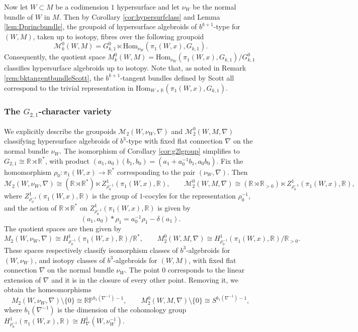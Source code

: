 \documentclass[10pt]{amsart}
\numberwithin{theoremalpha}{section}
\numberwithin{equation}{section}
\numberwithin{definition}{section}
\numberwithin{theorem}{section}
\numberwithin{proposition}{section}
\numberwithin{lemma}{section}
\numberwithin{example}{section}
\numberwithin{remark}{section}
\numberwithin{corollary}{section}
\numberwithin{question}{section}
\numberwithin{problem}{section}
\numberwithin{assumption}{section}
\theoremstyle{named}
\numberwithin{equation}{section}
\begin{document}
Now let $W \subset M$ be a codimension $1$ hypersurface and let $\nu_{W}$ be the normal bundle of $W$ in $M$. Then by Corollary \ref{cor:hypersurfclass} and Lemma \ref{lem:Dprincbundle}, the groupoid of hypersurface algebroids of $b^{k+1}$-type for $(W,M)$, taken up to isotopy, fibres over the following groupoid 
\[
\mathcal{M}^0_{k}(W,M) = G_{k,1}^{0} \ltimes \mathrm{Hom}_{\nu_W}(\pi_{1}(W,x), G_{k,1}). 
\]
Consequently, the quotient space $M^0_{k}(W,M) = \mathrm{Hom}_{\nu_W}(\pi_{1}(W,x), G_{k,1})/G_{k,1}^0$ classifies hypersurface algebroids up to isotopy. Note that, as noted in Remark \ref{rem:bktangentbundleScott}, the $b^{k+1}$-tangent bundles defined by Scott \cite{MR3523250} all correspond to the trivial representation in $\mathrm{Hom}_{W \times \mathbb{R}}(\pi_{1}(W,x), G_{k,1})$. 
\setcounter{subsection}{1}
\subsubsection{The $G_{2,1}$-character variety}
We explicitly describe the groupoids $\mathcal{M}_{2}(W, \nu_W, \nabla)$ and $\mathcal{M}^0_{2}(W,M, \nabla)$ classifying hypersurface algebroids of $b^3$-type with fixed flat connection $\nabla$ on the normal bundle $\nu_W$. The isomorphism of Corollary \ref{cor:g2lgroup} simplifies to $G_{2,1} \cong \mathbb{R} \rtimes \mathbb{R}^*$, with product $(a_1, a_0)(b_1, b_0) = (a_1 + a_0^{-1} b_1, a_0 b_0)$. Fix the homomorphism $\rho_0 : \pi_1(W,x) \to \mathbb{R}^*$ corresponding to the pair $(\nu_W, \nabla)$. Then 
\[
\mathcal{M}_{2}(W, \nu_W, \nabla) \cong (\mathbb{R} \rtimes \mathbb{R}^*) \ltimes Z^{1}_{\rho_0^{-1}}(\pi_{1}(W,x), \mathbb{R}), \qquad \mathcal{M}^0_{2}(W, M, \nabla) \cong (\mathbb{R} \rtimes \mathbb{R}_{>0}) \ltimes Z^{1}_{\rho_0^{-1}}(\pi_{1}(W,x), \mathbb{R}),
\]
where $Z^{1}_{\rho_0^{-1}}(\pi_{1}(W,x), \mathbb{R})$ is the group of $1$-cocyles for the representation $\rho_0^{-1}$, and the action of $\mathbb{R} \rtimes \mathbb{R}^*$ on $Z^{1}_{\rho_0^{-1}}(\pi_{1}(W,x), \mathbb{R})$ is given by 
\[
(a_1, a_0) \ast \rho_1 = a_0^{-1} \rho_1 - \delta(a_1). 
\]
The quotient spaces are then given by 
\[
M_{2}(W, \nu_W, \nabla) \cong H^{1}_{\rho_0^{-1}}(\pi_{1}(W,x), \mathbb{R})/\mathbb{R}^*, \qquad M^0_{2}(W, M, \nabla)  \cong H^{1}_{\rho_0^{-1}}(\pi_{1}(W,x), \mathbb{R})/\mathbb{R}_{>0}.
\]
These spaces respectively classify isomorphism classes of $b^{3}$-algebroids for $(W, \nu_{W})$, and isotopy classes of $b^{3}$-algebroids for $(W,M)$, with fixed flat connection $\nabla$ on the normal bundle $\nu_W$. The point $0$ corresponds to the linear extension of $\nabla$ and it is in the closure of every other point. Removing it, we obtain the homeomorphisms
\[
M_{2}(W, \nu_W, \nabla) \setminus \{ 0 \} \cong \mathbb{RP}^{b_{1}(\nabla^{-1})-1}, \qquad M^0_{2}(W, M, \nabla) \setminus \{ 0 \} \cong S^{b_{1}(\nabla^{-1})-1},
\]
where $b_{1}(\nabla^{-1})$ is the dimension of the cohomology group $H^{1}_{\rho_0^{-1}}(\pi_{1}(W,x), \mathbb{R}) \cong H^{1}_{\nabla}(W, \nu_W^{-1})$. 
\end{document}
